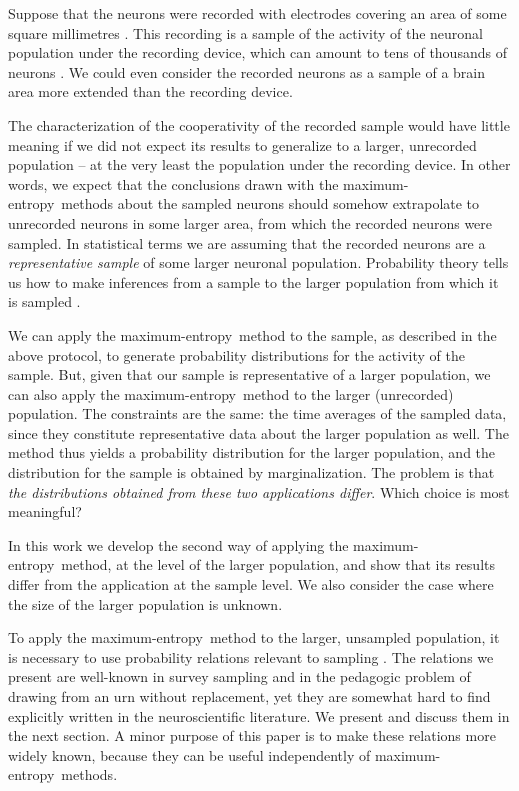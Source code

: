 \documentclass[\ifafour a4paper,12pt,\else a5paper,10pt,\fi%
onecolumn,oneside,article,%
british%
]{memoir}
\theoremstyle{remark}
\theoremstyle{innote}
\let\parentext=\parentexttrack%
\newcommand*{\citep}{\parencites}
\renewcommand*{\|}{\nonscript\,\vert\nonscript\;\mathopen{}}
\newcommand*{\chap}{ch.}%
\newcommand*{\cf}{{cf.}}
\newcommand*{\me}{maximum-entropy}
\begin{document}
Suppose that the neurons were recorded with electrodes covering an area of
some square millimetres \citep[\cf][]{berenyietal2014}. This recording is a
sample of the activity of the neuronal population under the recording
device, which can amount to tens of thousands of neurons
\citep{abeles1991}. We could even consider the recorded neurons as a sample
of a brain area more extended than the recording device.

The characterization of the cooperativity of the recorded sample would have
little meaning if we did not expect its results to generalize to a larger,
unrecorded population -- at the very least the population under the
recording device. In other words, we expect that the conclusions drawn with
the \me\ methods about the sampled neurons should somehow extrapolate to
unrecorded neurons in some larger area, from which the recorded neurons
were sampled. In statistical terms we are assuming that the recorded
neurons are a \emph{representative sample} of some larger neuronal
population. Probability theory tells us how to make inferences from a
sample to the larger population from which it is sampled \parentext{see
  references below}.

We can apply the \me\ method to the sample, as described in the above
protocol, to generate probability distributions for the activity of the
sample. But, given that our sample is representative of a larger
population, we can also apply the \me\ method to the larger (unrecorded)
population. The constraints are the same: the time averages of the sampled
data, since they constitute representative data about the larger population
as well. The method thus yields a probability distribution for the larger
population, and the distribution for the sample is obtained by
marginalization. The problem is that \emph{the distributions obtained from
  these two applications differ}. Which choice is most meaningful?

In this work we develop the second way of applying the \me\ method, at the
level of the larger population, and show that its results differ from the
application at the sample level. We also consider the case where the size
of the larger population is unknown.

To apply the \me\ method to the larger, unsampled population, it is
necessary to use probability relations relevant to sampling
\citep{ghoshetal1997}[parts~I,
VI]{freedmanetal1978_r2007}[\chap~8]{gelmanetal1995_r2014}[\chap~3]{jaynes1994_r2003}.
The relations we present are well-known in survey sampling and in the
pedagogic problem of drawing from an urn without replacement, yet they are
somewhat hard to find explicitly written in the neuroscientific literature.
We present and discuss them in the next section. A minor purpose of this
paper is to make these relations more widely known, because they can be
useful independently of \me\ methods.
\end{document}
